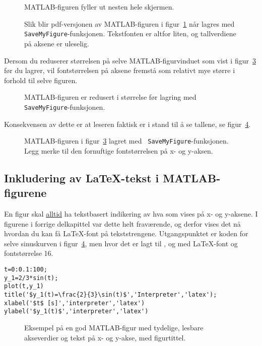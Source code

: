 \begin{figure}[H]
  \centering
  \caption{MATLAB-figuren fyller ut nesten hele skjermen.} 
  \label{fig:god_stort_vindu}
\end{figure}
\begin{figure}[H]
  \centering
  \caption{Slik blir pdf-versjonen av MATLAB-figuren i
    figur~\ref{fig:god_stort_vindu} når lagres med {\tt
      SaveMyFigure}-funksjonen. Tekstfonten er altfor liten, og
    tallverdiene på aksene er uleselig.}  
  \label{fig:god}
\end{figure}

Dersom du reduserer størrelsen på selve MATLAB-figurvinduet 
som vist i figur~\ref{fig:god_lite_vindu} før du lagrer, vil fontstørrelsen på
aksene fremstå som relativt mye større i forhold til selve figuren. 
\begin{figure}[H]
  \centering
  \caption{MATLAB-figuren er redusert i størrelse før lagring med {\tt
      SaveMyFigure}-funksjonen.} 
  \label{fig:god_lite_vindu}
\end{figure}
Konsekvensen av dette er at leseren
faktisk er i stand til å se tallene, se figur~\ref{fig:god2}.
\begin{figure}[H]
  \centering
  \caption{MATLAB-figuren i figur~\ref{fig:god_lite_vindu} lagret med {\tt
      SaveMyFigure}-funksjonen. Legg merke til den fornuftige
    fontstørrelsen  på x- og  y-aksen.} 
  \label{fig:god2}
\end{figure}

\subsection{Inkludering av {\LaTeX}-tekst i MATLAB-figurene} 
En figur skal \underline{alltid} ha tekstbasert 
indikering av hva som vises på x- og y-aksene.  I figurene i forrige
delkapittel var dette helt fraværende, og derfor vises det nå
hvordan du kan få {\LaTeX}-font på tekststrengene. Utgangspunktet er
koden for selve sinuskurven i figur~\ref{fig:god2}, men hvor det er
lagt til ,  og  med
{\LaTeX}-font og fontstørrelse 16.

\begin{boxedminipage}{\textwidth}
\begin{verbatim}
t=0:0.1:100;
y_1=2/3*sin(t);
plot(t,y_1)
title('$y_1(t)=\frac{2}{3}\sin(t)$','Interpreter','latex');
xlabel('$t$ [s]','interpreter','latex')
ylabel('$y_1(t)$','interpreter','latex')
\end{verbatim}
\end{boxedminipage}

\begin{figure}[H]
  \centering
  \caption{Eksempel på en god MATLAB-figur med tydelige, lesbare
    akseverdier og tekst på x- og y-akse, med figurtittel.} 
  \label{fig:god3}
\end{figure}

